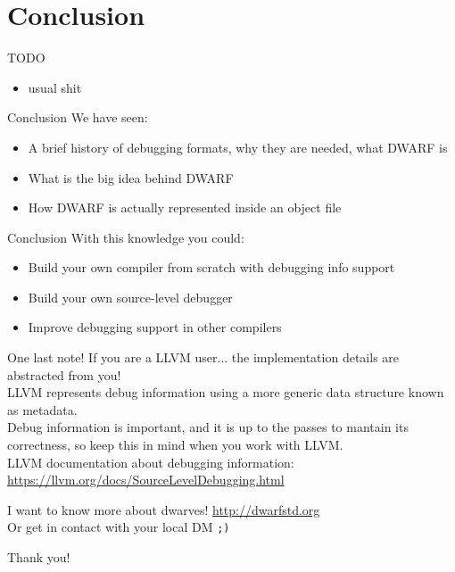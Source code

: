 
\section{Conclusion}


\begin{frame}{TODO}
\begin{itemize}
\item usual shit
\end{itemize}
\end{frame}


\begin{frame}{Conclusion}
We have seen:
\begin{itemize}
\item A brief history of debugging formats, why they are needed, what DWARF is
\item What is the big idea behind DWARF
\item How DWARF is actually represented inside an object file
\end{itemize}
\end{frame}


\begin{frame}{Conclusion}
With this knowledge you could:

\begin{itemize}
\item Build your own compiler from scratch with debugging info support
\item Build your own source-level debugger
\item Improve debugging support in other compilers
\end{itemize}
\end{frame}


\begin{frame}{One last note!}
If you are a LLVM user... the implementation details are \alert{abstracted} from you!\\
\medskip
LLVM represents debug information using a more generic data structure known
as \alert{metadata}.\\
\medskip
Debug information is important, and it is \alert{up to the passes} to mantain its
correctness, so keep this in mind when you work with LLVM.\\
\bigskip
LLVM documentation about debugging information: \url{https://llvm.org/docs/SourceLevelDebugging.html}
\end{frame}


\begin{frame}{I want to know more about dwarves!}
\Large
\centering
\vfill
\url{http://dwarfstd.org}\\
\vfill
\scriptsize
Or get in contact with your local DM \texttt{;)}
\end{frame}


\begin{frame}{}
\begin{center}
\Huge
Thank you!
\end{center}
\end{frame}


